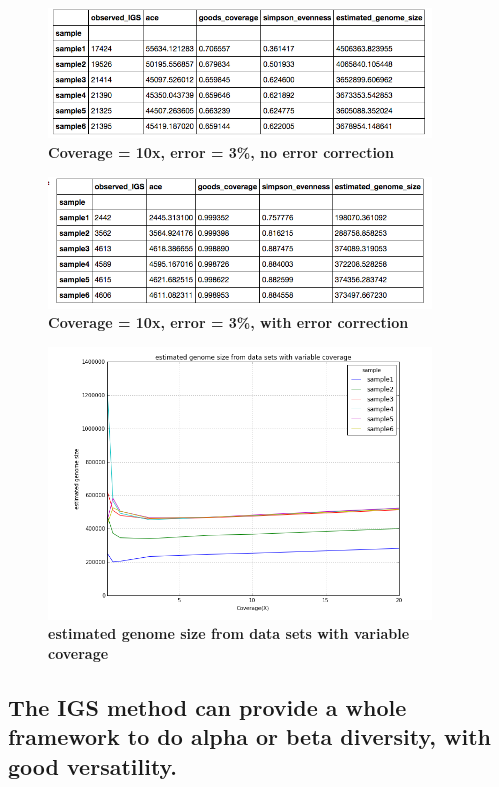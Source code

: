 \documentclass{article}
\begin{document}
\begin{figure}[!ht]
 \centerline{\includegraphics[width=4in]{./figures/IGS_table_alpha1_10x_3_ne.png}}
\caption{\bf Coverage = 10x, error = 3\%, no error correction}
\label{fig:IGS_table_alpha1_10x_3_ne}
\end{figure}



\begin{figure}[!ht]
 \centerline{\includegraphics[width=4in]{./figures/IGS_table_alpha1_10x_3_e.png}}
\caption{\bf Coverage = 10x, error = 3\%, with error correction}
\label{fig:IGS_table_alpha1_10x_3_e}
\end{figure}

\begin{figure}[!ht]
 \centerline{\includegraphics[width=4in]{./figures/IGS_figure_test_alpha.png}}
\caption{\bf estimated genome size from data sets with variable coverage}
\label{fig:IGS_figure_test_alpha}
\end{figure}


\subsection{The IGS method can provide a whole framework to do alpha or beta diversity, with good versatility.}
\end{document}
